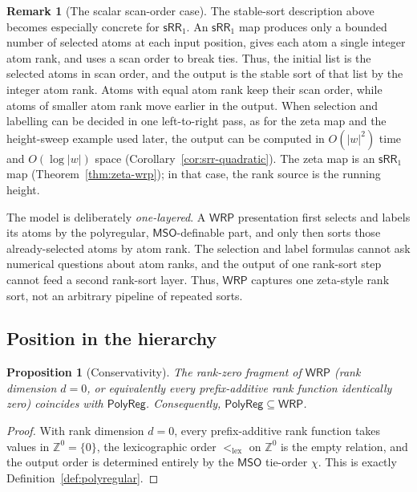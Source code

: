 \documentclass[11pt]{article}
\newtheorem{proposition}[theorem]{Proposition}
\theoremstyle{definition}
\newtheorem{remark}[theorem]{Remark}
\newcommand{\Z}{\mathbb Z}
\newcommand{\WRP}{\mathsf{WRP}}
\newcommand{\SWR}{\mathsf{sRR}_1}
\newcommand{\MSO}{\mathsf{MSO}}
\newcommand{\polyreg}{\mathsf{PolyReg}}
\begin{document}
\begin{remark}[The scalar scan-order case]\label{rem:swr}
The stable-sort description above becomes especially concrete for $\SWR$.
An $\SWR$ map produces only a bounded number of selected atoms at each input
position, gives each atom a single integer atom rank, and uses a scan order to
break ties.  Thus, the initial list is the selected atoms in scan order, and the
output is the stable sort of that list by the integer atom rank.  Atoms with
equal atom rank keep their scan order, while atoms of smaller atom rank move
earlier in the output.
When selection and labelling can be decided in one left-to-right pass, as for
the zeta map and the height-sweep example used later, the output can be computed in
$O(|w|^2)$ time and $O(\log|w|)$ space
(Corollary~\ref{cor:srr-quadratic}).  The zeta map is an $\SWR$ map
(Theorem~\ref{thm:zeta-wrp}); in that case, the rank source is the running
height.
\end{remark}

The model is deliberately \emph{one-layered}.  A $\WRP$ presentation first
selects and labels its atoms by the polyregular, $\MSO$-definable part, and
only then sorts those already-selected atoms by atom rank.  The selection and
label formulas cannot ask numerical questions about atom ranks, and the output of one
rank-sort step cannot feed a second rank-sort layer.  Thus, $\WRP$ captures one
zeta-style rank sort, not an arbitrary pipeline of repeated sorts.

\subsection{Position in the hierarchy}

\begin{proposition}[Conservativity]
\label{prop:conservative}
The rank-zero fragment of $\WRP$ (rank dimension $d=0$, or equivalently
every prefix-additive rank function identically zero) coincides with $\polyreg$.
Consequently, $\polyreg\subseteq\WRP$.
\end{proposition}

\begin{proof}
With rank dimension $d=0$, every prefix-additive rank function takes values in
$\Z^0=\{0\}$, the lexicographic order $<_{\mathrm{lex}}$ on $\Z^0$ is the empty
relation, and the output order is determined entirely by the $\MSO$
tie-order $\chi$.  This is exactly Definition~\ref{def:polyregular}.
\end{proof}
\end{document}

